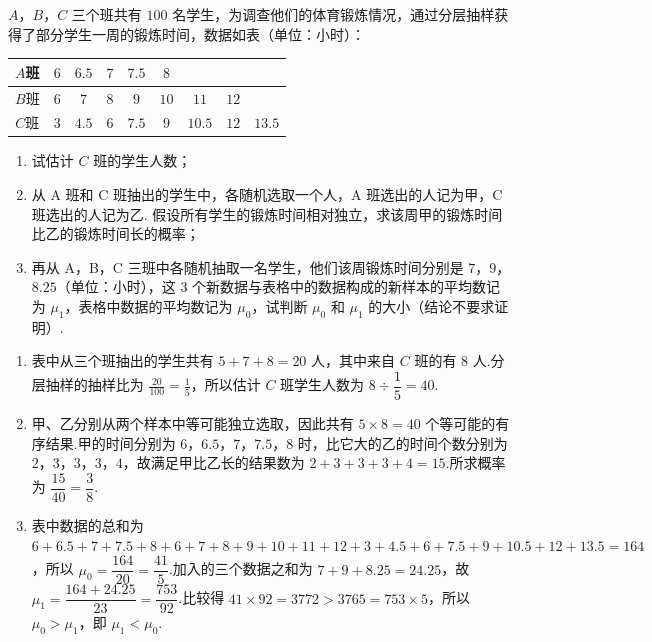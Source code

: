 \begin{problem}
\(A\)，\(B\)，\(C\) 三个班共有 \(100\) 名学生，为调查他们的体育锻炼情况，通过分层抽样获得了部分学生一周的锻炼时间，数据如表（单位：小时）：

\begin{center}
\begin{tabular}{|c|cccccccc|}
\hline
\(A\)班 & \(6\) & \(6.5\) & \(7\) & \(7.5\) & \(8\) & & & \\
\hline
\(B\)班 & \(6\) & \(7\) & \(8\) & \(9\) & \(10\) & \(11\) & \(12\) & \\
\hline
\(C\)班 & \(3\) & \(4.5\) & \(6\) & \(7.5\) & \(9\) & \(10.5\) & \(12\) & \(13.5\) \\
\hline
\end{tabular}
\end{center}

\begin{enumerate}
\item 试估计 \(C\) 班的学生人数；
\item 从 A 班和 C 班抽出的学生中，各随机选取一个人，A 班选出的人记为甲，C 班选出的人记为乙. 假设所有学生的锻炼时间相对独立，求该周甲的锻炼时间比乙的锻炼时间长的概率；
\item 再从 A，B，C 三班中各随机抽取一名学生，他们该周锻炼时间分别是 \(7\)，\(9\)，\(8.25\)（单位：小时），这 \(3\) 个新数据与表格中的数据构成的新样本的平均数记为 \(\mu_1\)，表格中数据的平均数记为 \(\mu_0\)，试判断 \(\mu_0\) 和 \(\mu_1\) 的大小（结论不要求证明）.
\end{enumerate}
\end{problem}

\begin{solution}
\begin{enumerate}
\item 表中从三个班抽出的学生共有 \(5+7+8=20\) 人，其中来自 \(C\) 班的有 \(8\) 人.分层抽样的抽样比为 \(\frac{20}{100}=\frac{1}{5}\)，所以估计 \(C\) 班学生人数为 \(8\div\dfrac15=40\).
\item 甲、乙分别从两个样本中等可能独立选取，因此共有 \(5\times8=40\) 个等可能的有序结果.甲的时间分别为 \(6\)，\(6.5\)，\(7\)，\(7.5\)，\(8\) 时，比它大的乙的时间个数分别为 \(2\)，\(3\)，\(3\)，\(3\)，\(4\)，故满足甲比乙长的结果数为 \(2+3+3+3+4=15\).所求概率为 \(\dfrac{15}{40}=\dfrac38\).
\item 表中数据的总和为
\(6+6.5+7+7.5+8+6+7+8+9+10+11+12+3+4.5+6+7.5+9+10.5+12+13.5=164\)，所以 \(\mu_0=\dfrac{164}{20}=\dfrac{41}{5}\).加入的三个数据之和为 \(7+9+8.25=24.25\)，故 \(\mu_1=\dfrac{164+24.25}{23}=\dfrac{753}{92}\).比较得 \(41\times92=3772>3765=753\times5\)，所以 \(\mu_0>\mu_1\)，即 \(\mu_1<\mu_0\).
\end{enumerate}
\end{solution}


